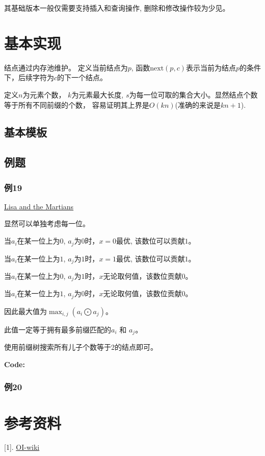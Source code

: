 \documentclass{article}
\renewcommand{\next}{\text{next}}
\begin{document}
其基础版本一般仅需要支持插入和查询操作, 删除和修改操作较为少见。


\section{基本实现}
结点通过内存池维护。
定义当前结点为$p$, 函数$\next(p, c)$表示当前为结点$p$的条件下，后续字符为$c$的下一个结点。

定义$n$为元素个数， $k$为元素最大长度, $s$为每一位可取的集合大小。显然结点个数等于所有不同前缀的个数，
容易证明其上界是$O(kn)$(准确的来说是$kn+1$).

\subsection{基本模板}


\subsection{例题}
\subsubsection{例19}
\href{https://codeforces.com/contest/1851/problem/F}{Lisa and the Martians}

显然可以单独考虑每一位。

当$a_i$在某一位上为$0$, $a_j$为$0$时，$x = 0$最优, 该数位可以贡献$1$。

当$a_i$在某一位上为$1$, $a_j$为$1$时，$x = 1$最优, 该数位可以贡献$1$。

当$a_i$在某一位上为$0$, $a_j$为$1$时，$x$无论取何值，该数位贡献$0$。

当$a_i$在某一位上为$1$, $a_j$为$0$时，$x$无论取何值，该数位贡献$0$。

因此最大值为$\max_{i,j}(a_i \bigodot a_j)$。

此值一定等于拥有最多前缀匹配的$a_i$ 和 $a_j$。

使用前缀树搜索所有儿子个数等于2的结点即可。

\textbf{Code:}
\subsubsection{例20}




\section{参考资料}
 [1]. \href{https://oi-wiki.org/graph/tree-diameter/}{OI-wiki}
\end{document}
